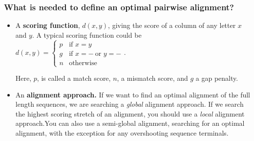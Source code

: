 \documentclass[aspectratio=1610]{beamer}
\begin{document}
\begin{frame}
\frametitle{What is needed to define an optimal pairwise alignment?}
\begin{itemize}
    \item<1-> A \textbf{scoring function}, $d(x,y)$, giving the score of a column of any letter $x$ and $y$. A typical scoring function could be $\displaystyle d(x,y)= \begin{cases}p & \textrm{if\ } x=y\\ g& \textrm{if\ } x=- \ \textrm{or\ } y=-\\ n & \textrm{otherwise } \end{cases}$. 
    
    Here, $p$, is called a match score, $n$, a mismatch 
    score, and $g$ a gap penalty.  
    \item<2-> An \textbf{alignment approach.} If we want to find an optimal alignment of the full length sequences, we are searching a {\em global} alignment approach. If we search the highest scoring stretch of an alignment, you should use a {\em local} alignment approach.You can also use a semi-global alignment, searching for an optimal alignment, with the exception for any overshooting sequence terminals. 
\end{itemize}
\end{frame}
\end{document}
